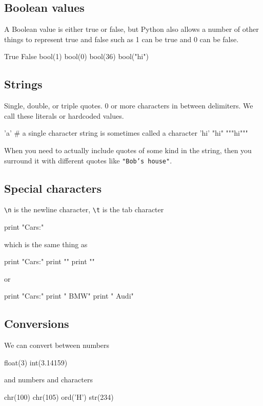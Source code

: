 \documentclass[titlepage]{tufte-book}
\begin{document}
\begin{fullwidth}
\subsection{Boolean values}

A Boolean value is either true or false, but Python also allows a number of other things to represent true and false such as 1 can be true and 0 can be false.

\begin{pyconsole}[d]
True
False
bool(1)
bool(0)
bool(36)
bool("hi")
\end{pyconsole}

\subsection{Strings}

Single, double, or triple quotes. 0 or more characters in between delimiters. We call these literals or hardcoded values.

\begin{pyconsole}[e]
'a'  # a single character string is sometimes called a character
'hi'
"hi"
"""hi"""
\end{pyconsole}

When you need to actually include quotes of some kind in the string, then you surround it with different quotes like {\tt "Bob's house"}.

\subsection{Special characters}

{\tt \textbackslash n}  is the newline character, {\tt \textbackslash t}  is the tab character


\begin{pyconsole}[f]
print "Cars:\n\tBMW\n\tAudi"
\end{pyconsole}

which is the same thing as
 
\begin{pyconsole}[g]
print "Cars:"
print "\tBMW"
print "\tAudi"
\end{pyconsole}

or

\begin{pyconsole}[h]
print "Cars:"
print "	BMW"
print "	Audi"
\end{pyconsole}


\subsection{Conversions}

We can convert between numbers

\begin{pyconsole}[i]
float(3)
int(3.14159)
\end{pyconsole}

and numbers and characters

\begin{pyconsole}[j]
chr(100)
chr(105)
ord('H')
str(234)
\end{pyconsole}

\end{fullwidth}
\end{document}
